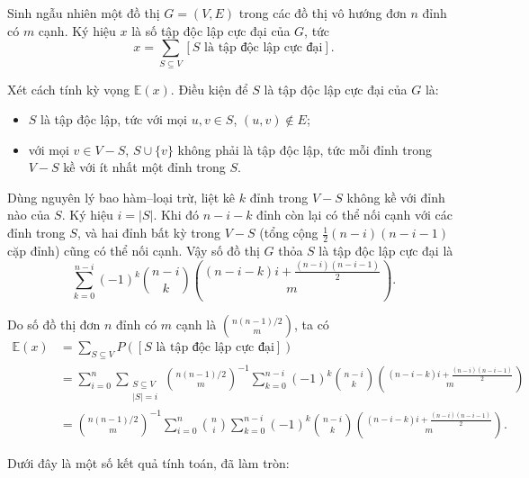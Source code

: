 \documentclass[11pt]{article}
\begin{document}
Sinh ngẫu nhiên một đồ thị \(G=(V,E)\) trong các đồ thị vô hướng đơn \(n\) đỉnh
có \(m\) cạnh. Ký hiệu \(x\) là số tập độc lập cực đại của \(G\), tức
\[
  x=\sum_{S\subseteq V} [S\text{ là tập độc lập cực đại}].
\]

Xét cách tính kỳ vọng \(\mathbb{E}(x)\). Điều kiện để \(S\) là tập độc lập cực
đại của \(G\) là:

\begin{itemize}
  \item \(S\) là tập độc lập, tức với mọi \(u,v\in S\), \((u,v)\notin E\);

  \item với mọi \(v\in V-S\), \(S\cup\{v\}\) không phải là tập độc lập, tức mỗi
  đỉnh trong \(V-S\) kề với ít nhất một đỉnh trong \(S\).
\end{itemize}

Dùng nguyên lý bao hàm--loại trừ, liệt kê \(k\) đỉnh trong \(V-S\) không kề với
đỉnh nào của \(S\). Ký hiệu \(i=|S|\). Khi đó \(n-i-k\) đỉnh còn lại có thể nối
cạnh với các đỉnh trong \(S\), và hai đỉnh bất kỳ trong \(V-S\) (tổng cộng
\(\frac12(n-i)(n-i-1)\) cặp đỉnh) cũng có thể nối cạnh. Vậy số đồ thị \(G\)
thỏa \(S\) là tập độc lập cực đại là
\[
  \sum_{k=0}^{n-i}(-1)^k\binom{n-i}{k}
  \binom{(n-i-k)i+\frac{(n-i)(n-i-1)}{2}}{m}.
\]

Do số đồ thị đơn \(n\) đỉnh có \(m\) cạnh là
\(\binom{n(n-1)/2}{m}\), ta có
\[
\begin{aligned}
  \mathbb{E}(x)
    &=\sum_{S\subseteq V}P([S\text{ là tập độc lập cực đại}])\\
    &=\sum_{i=0}^{n}\sum_{\substack{S\subseteq V\\ |S|=i}}
      \binom{n(n-1)/2}{m}^{-1}
      \sum_{k=0}^{n-i}(-1)^k\binom{n-i}{k}
      \binom{(n-i-k)i+\frac{(n-i)(n-i-1)}{2}}{m}\\
    &=\binom{n(n-1)/2}{m}^{-1}\sum_{i=0}^{n}\binom{n}{i}
      \sum_{k=0}^{n-i}(-1)^k\binom{n-i}{k}
      \binom{(n-i-k)i+\frac{(n-i)(n-i-1)}{2}}{m}.
\end{aligned}
\]

Dưới đây là một số kết quả tính toán, đã làm tròn:
\end{document}
